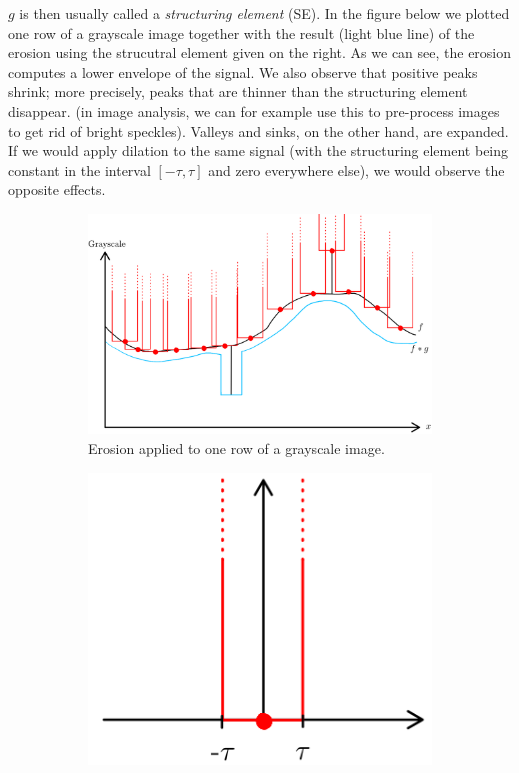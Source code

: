 $g$ is then usually called a \emph{structuring element} (SE). In the
figure below we plotted one row of a grayscale image together with the
result (light blue line) of the erosion using the strucutral element
given on the right. As we can see, the erosion computes a lower
envelope of the signal. We also observe that positive peaks shrink;
more precisely, peaks that are thinner than the structuring element
disappear.  (in image analysis, we can for example use this to
pre-process images to get rid of bright speckles). Valleys and sinks,
on the other hand, are expanded. If we would apply dilation to the
same signal (with the structuring element being constant in the
interval $[-\tau, \tau]$ and zero everywhere else), we would observe
the opposite effects.

\begin{figure}[htpb]
  \centering
  \begin{subfigure}[b]{0.5\textwidth}
    \includegraphics[width=\textwidth]{Figures/tropical_convolution}
    \caption{Erosion applied to one row of a grayscale image.}
  \end{subfigure}\hspace{3em}%
  \begin{subfigure}[b]{0.3\textwidth}
    \includegraphics[width=\textwidth]{Figures/structural_element}

\end{subfigure}
\end{figure}
